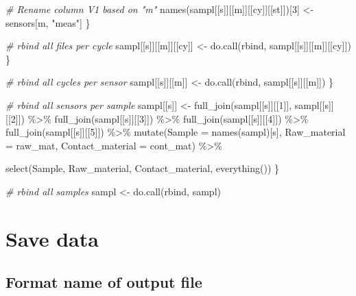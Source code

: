 \documentclass[
]{article}
\newenvironment{Shaded}{\begin{snugshade}}{\end{snugshade}}
\newcommand{\AttributeTok}[1]{\textcolor[rgb]{0.77,0.63,0.00}{#1}}
\newcommand{\CommentTok}[1]{\textcolor[rgb]{0.56,0.35,0.01}{\textit{#1}}}
\newcommand{\DecValTok}[1]{\textcolor[rgb]{0.00,0.00,0.81}{#1}}
\newcommand{\FunctionTok}[1]{\textcolor[rgb]{0.00,0.00,0.00}{#1}}
\newcommand{\NormalTok}[1]{#1}
\newcommand{\OtherTok}[1]{\textcolor[rgb]{0.56,0.35,0.01}{#1}}
\newcommand{\SpecialCharTok}[1]{\textcolor[rgb]{0.00,0.00,0.00}{#1}}
\newcommand{\StringTok}[1]{\textcolor[rgb]{0.31,0.60,0.02}{#1}}
\begin{document}
\begin{Shaded}
\begin{Highlighting}[]
        \CommentTok{\# Rename column V1 based on "m"}
        \FunctionTok{names}\NormalTok{(sampl[[s]][[m]][[cy]][[st]])[}\DecValTok{3}\NormalTok{] }\OtherTok{\textless{}{-}}\NormalTok{ sensors[m, }\StringTok{"meas"}\NormalTok{] }
\NormalTok{      \}}
      
      \CommentTok{\# rbind all files per cycle}
\NormalTok{      sampl[[s]][[m]][[cy]] }\OtherTok{\textless{}{-}} \FunctionTok{do.call}\NormalTok{(rbind, sampl[[s]][[m]][[cy]])}
\NormalTok{    \}}
    
    \CommentTok{\# rbind all cycles per sensor}
\NormalTok{    sampl[[s]][[m]] }\OtherTok{\textless{}{-}} \FunctionTok{do.call}\NormalTok{(rbind, sampl[[s]][[m]])}
\NormalTok{  \}}
  
  \CommentTok{\# rbind all sensors per sample}
\NormalTok{  sampl[[s]] }\OtherTok{\textless{}{-}} \FunctionTok{full\_join}\NormalTok{(sampl[[s]][[}\DecValTok{1}\NormalTok{]], sampl[[s]][[}\DecValTok{2}\NormalTok{]]) }\SpecialCharTok{\%\textgreater{}\%} 
    \FunctionTok{full\_join}\NormalTok{(sampl[[s]][[}\DecValTok{3}\NormalTok{]]) }\SpecialCharTok{\%\textgreater{}\%} 
    \FunctionTok{full\_join}\NormalTok{(sampl[[s]][[}\DecValTok{4}\NormalTok{]]) }\SpecialCharTok{\%\textgreater{}\%}
    \FunctionTok{full\_join}\NormalTok{(sampl[[s]][[}\DecValTok{5}\NormalTok{]]) }\SpecialCharTok{\%\textgreater{}\%} 
    \FunctionTok{mutate}\NormalTok{(}\AttributeTok{Sample =} \FunctionTok{names}\NormalTok{(sampl)[s], }\AttributeTok{Raw\_material =}\NormalTok{ raw\_mat, }
           \AttributeTok{Contact\_material =}\NormalTok{ cont\_mat) }\SpecialCharTok{\%\textgreater{}\%}
    
    \FunctionTok{select}\NormalTok{(Sample, Raw\_material, Contact\_material, }\FunctionTok{everything}\NormalTok{())}
\NormalTok{\}}

\CommentTok{\# rbind all samples }
\NormalTok{sampl }\OtherTok{\textless{}{-}} \FunctionTok{do.call}\NormalTok{(rbind, sampl)}
\end{Highlighting}
\end{Shaded}

\hypertarget{save-data}{%
\section{Save data}\label{save-data}}

\hypertarget{format-name-of-output-file}{%
\subsection{Format name of output
file}\label{format-name-of-output-file}}
\end{document}
